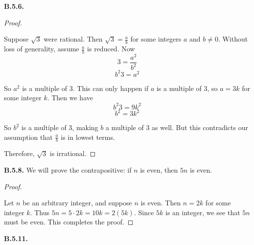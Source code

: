 \documentclass[10pt,]{book}
\theoremstyle{plain}
\theoremstyle{definition}
\theoremstyle{definition}
\theoremstyle{definition}
\theoremstyle{definition}
\numberwithin{equation}{chapter}
\begin{document}
\noindent\textbf{B.5.6.} \begin{proof}\hypertarget{proof-32}{}
\hypertarget{p-2149}{}%
Suppose \(\sqrt{3}\) were rational. Then \(\sqrt{3} = \frac{a}{b}\) for some integers \(a\) and \(b \ne 0\). Without loss of generality, assume \(\frac{a}{b}\) is reduced. Now%
\begin{equation*}
3 = \frac{a^2}{b^2}
\end{equation*}
%
\begin{equation*}
b^2 3 = a^2
\end{equation*}
%
\par
\hypertarget{p-2150}{}%
So \(a^2\) is a multiple of 3. This can only happen if \(a\) is a multiple of 3, so \(a = 3k\) for some integer \(k\). Then we have%
\begin{equation*}
b^2 3 = 9k^2
\end{equation*}
%
\begin{equation*}
b^2 = 3k^2
\end{equation*}
%
\par
\hypertarget{p-2151}{}%
So \(b^2\) is a multiple of 3, making \(b\) a multiple of 3 as well. But this contradicts our assumption that \(\frac{a}{b}\) is in lowest terms.%
\par
\hypertarget{p-2152}{}%
Therefore, \(\sqrt{3}\) is irrational.%
\end{proof}
\par\smallskip
\noindent\textbf{B.5.8.} \hypertarget{p-2158}{}%
We will prove the contrapositive: if \(n\) is even, then \(5n\) is even.%
\begin{proof}\hypertarget{proof-33}{}
\hypertarget{p-2159}{}%
Let \(n\) be an arbitrary integer, and suppose \(n\) is even. Then \(n = 2k\) for some integer \(k\). Thus \(5n = 5\cdot 2k = 10k = 2(5k)\). Since \(5k\) is an integer, we see that \(5n\) must be even. This completes the proof.%
\end{proof}
\par\smallskip
\noindent\textbf{B.5.11.} \hypertarget{p-2164}{}%
\leavevmode%
\end{document}
